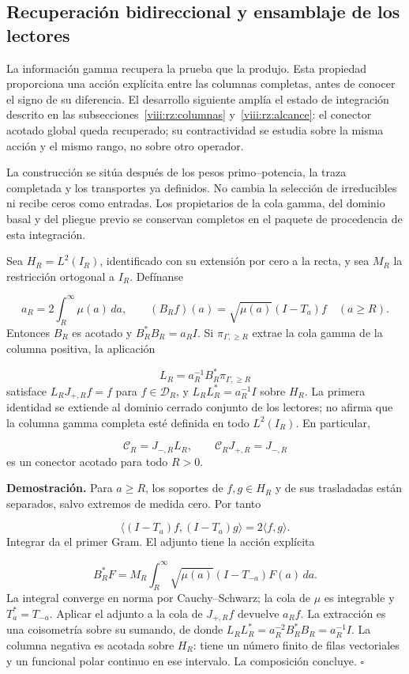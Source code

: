 \subsection{Recuperación bidireccional y ensamblaje de los lectores}
\label{viii:rz:gamma}
La información gamma recupera la prueba que la produjo. Esta propiedad proporciona una acción explícita entre las columnas completas, antes de conocer el signo de su diferencia. El desarrollo siguiente amplía el estado de integración descrito en las subsecciones~\ref{viii:rz:columnas} y~\ref{viii:rz:alcance}: el conector acotado global queda recuperado; su contractividad se estudia sobre la misma acción y el mismo rango, no sobre otro operador.

La construcción se sitúa después de los pesos primo–potencia, la traza completada y los transportes ya definidos. No cambia la selección de irreducibles ni recibe ceros como entradas. Los propietarios de la cola gamma, del dominio basal y del pliegue previo se conservan completos en el paquete de procedencia de esta integración.

Sea \(H_R=L^2(I_R)\), identificado con su extensión por cero a la recta, y sea \(M_R\) la restricción ortogonal a \(I_R\). Defínanse

\[
a_R=2\int_R^\infty\mu(a)\,da,\qquad
(B_Rf)(a)=\sqrt{\mu(a)}(I-T_a)f\quad(a\geq R).
\]
Entonces \(B_R\) es acotado y \(B_R^*B_R=a_RI\). Si \(\pi_{\Gamma,\geq R}\) extrae la cola gamma de la columna positiva, la aplicación

\[
L_R=a_R^{-1}B_R^*\pi_{\Gamma,\geq R}
\]
satisface \(L_RJ_{+,R}f=f\) para \(f\in\mathcal D_R\), y \(L_RL_R^*=a_R^{-1}I\) sobre \(H_R\). La primera identidad se extiende al dominio cerrado conjunto de los lectores; no afirma que la columna gamma completa esté definida en todo \(L^2(I_R)\). En particular,

\[
\mathcal C_R=J_{-,R}L_R,\qquad
\mathcal C_RJ_{+,R}=J_{-,R}
\]
es un conector acotado para todo \(R>0\).

\textbf{Demostración.} Para \(a\geq R\), los soportes de \(f,g\in H_R\) y de sus trasladadas están separados, salvo extremos de medida cero. Por tanto

\[
\langle(I-T_a)f,(I-T_a)g\rangle=2\langle f,g\rangle.
\]
Integrar da el primer Gram. El adjunto tiene la acción explícita

\[
B_R^*F=M_R\int_R^\infty\sqrt{\mu(a)}(I-T_{-a})F(a)\,da.
\]
La integral converge en norma por Cauchy–Schwarz; la cola de \(\mu\) es integrable y \(T_a^*=T_{-a}\). Aplicar el adjunto a la cola de \(J_{+,R}f\) devuelve \(a_Rf\). La extracción es una coisometría sobre su sumando, de donde \(L_RL_R^*=a_R^{-2}B_R^*B_R=a_R^{-1}I\). La columna negativa es acotada sobre \(H_R\): tiene un número finito de filas vectoriales y un funcional polar continuo en ese intervalo. La composición concluye. \hfill\(\square\)


